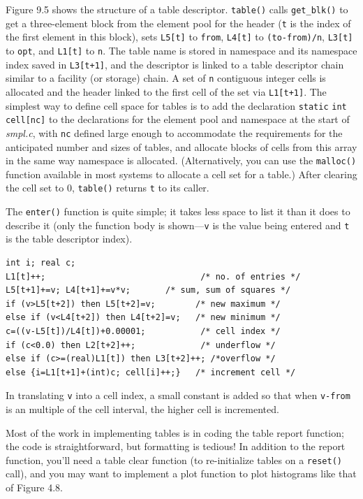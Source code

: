 Figure 9.5 shows the structure of a table descriptor.\newline
\texttt{table()} calls
\texttt{get\_blk()} to get a three-element block from the element pool for the
header (\texttt{t} is the index of the first element in this block), sets \texttt{L5[t]} to \texttt{from},
\texttt{L4[t]} to \texttt{(to-from)/n}, \texttt{L3[t]} to \texttt{opt}, and \texttt{L1[t]} to \texttt{n}. The table name is
stored in namespace and its namespace index saved in \texttt{L3[t+1]}, and the
descriptor is linked to a table descriptor chain similar to a facility (or
storage) chain. A set of \texttt{n} contiguous integer cells is allocated and the header
linked to the first cell of the set via \texttt{L1[t+1]}. The simplest way to define
cell space for tables is to add the declaration \texttt{static} \texttt{int} \texttt{cell[nc]} to the
\noindent declarations for the element pool and namespace at the start of \emph{smpl.c}, with
\texttt{nc} defined large enough to accommodate the requirements for the
anticipated number and sizes of tables, and allocate blocks of cells from this
array in the same way namespace is allocated. (Alternatively, you can use
the \texttt{malloc()} function available in most systems to allocate a cell set for a
table.) After clearing the cell set to 0, \texttt{table()} returns \texttt{t} to its caller.

The \texttt{enter()} function is quite simple; it takes less space to list it than it
does to describe it (only the function body is shown---\texttt{v} is the value being
entered and \texttt{t} is the table descriptor index).
\begin{verbatim}
int i; real c;
L1[t]++;                               /* no. of entries */
L5[t+1]+=v; L4[t+1]+=v*v;       /* sum, sum of squares */
if (v>L5[t+2]) then L5[t+2]=v;        /* new maximum */
else if (v<L4[t+2]) then L4[t+2]=v;   /* new minimum */
c=((v-L5[t])/L4[t])+0.00001;           /* cell index */
if (c<0.0) then L2[t+2]++;             /* underflow */
else if (c>=(real)L1[t]) then L3[t+2]++; /*overflow */
else {i=L1[t+1]+(int)c; cell[i]++;}   /* increment cell */
\end{verbatim}

In translating \texttt{v} into a cell index, a small constant is added so that when
\texttt{v-from} is an multiple of the cell interval, the higher cell is incremented.

Most of the work in implementing tables is in coding the table report
function; the code is straightforward, but formatting is tedious! In addition
to the report function, you'll need a table clear function (to re-initialize
tables on a \texttt{reset()} call), and you may want to implement a plot function to
plot histograms like that of Figure 4.8.

